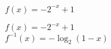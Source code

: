 {$f(x) = -2^{-x} + 1$}
{$f(x) = -2^{-x} + 1$\\
$f^{-1}(x) = -\log_{2}(1 - x)$\\

\begin{center}
\end{center}}

